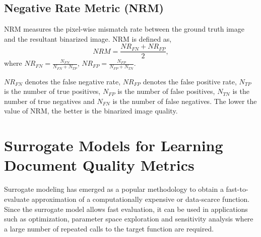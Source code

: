 \documentclass[10pt, a4paper, conference, compsocconf]{IEEEtran}
\begin{document}
\subsection{Negative Rate Metric (NRM)}
NRM measures the pixel-wise mismatch rate between the ground truth image and the resultant binarized image. NRM is defined as,
\begin{equation} 
NRM = \frac{NR_{FN} + NR_{FP}}{2},
\label{eq_nrm}
\end{equation}
where $NR_{FN}=\frac{N_{FN}}{N_{FN} + N_{TP}}$, $NR_{FP}=\frac{N_{FP}}{N_{FP} + N_{TN}}$. \newline

\noindent $NR_{FN}$ denotes the false negative rate, $NR_{FP}$ denotes the false positive rate, $N_{TP}$ is the number of true positives, $N_{FP}$ is the number of false positives, $N_{TN}$ is the number of true negatives and $N_{FN}$ is the number of false negatives. The lower the value of NRM, the better is the binarized image quality. 

%

\section{Surrogate Models for Learning Document Quality Metrics}
\label{surrogate}
Surrogate modeling \cite{gorissen2010surrogate} has emerged as a popular methodology to obtain a fast-to-evaluate approximation of a computationally expensive or data-scarce function. Since the surrogate model allows fast evaluation, it can be used in applications such as optimization, parameter space exploration and sensitivity analysis where a large number of repeated calls to the target function are required. 
\end{document}
